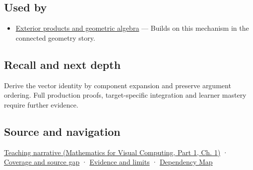 \subsection{Used by}\label{appendix-5caa058bd9c7-used-by}

\hypertarget{appendix-5caa058bd9c7-used-by}{}

\begin{itemize}
\tightlist
\item
  \hyperref[appendix-e1960925d1b8]{Exterior products and geometric algebra} --- Builds on this mechanism in the connected geometry story.
\end{itemize}

\subsection{Recall and next depth}\label{appendix-5caa058bd9c7-recall-and-next-depth}

\hypertarget{appendix-5caa058bd9c7-recall-and-next-depth}{}

Derive the vector identity by component expansion and preserve argument ordering. Full production proofs, target-specific integration and learner mastery require further evidence.

\subsection{Source and navigation}\label{appendix-5caa058bd9c7-source-and-navigation}

\hypertarget{appendix-5caa058bd9c7-source-and-navigation}{}

\href{../02-Mathematics-for-Visual-Computing-P01/main.pdf\#nameddest=01-foundations-i-ch017-signed-volume-extends-the-same-idea-into-space}{Teaching narrative (Mathematics for Visual Computing, Part 1, Ch. 1)} · \hyperref[appendix-fd090d982a15-phase-6---parts-501-600]{Coverage and source gap} · \hyperref[appendix-a103e7846d21-phase-6---source-analysis-and-verification]{Evidence and limits} · \hyperref[appendix-4ad47bdd269a]{Dependency Map}
